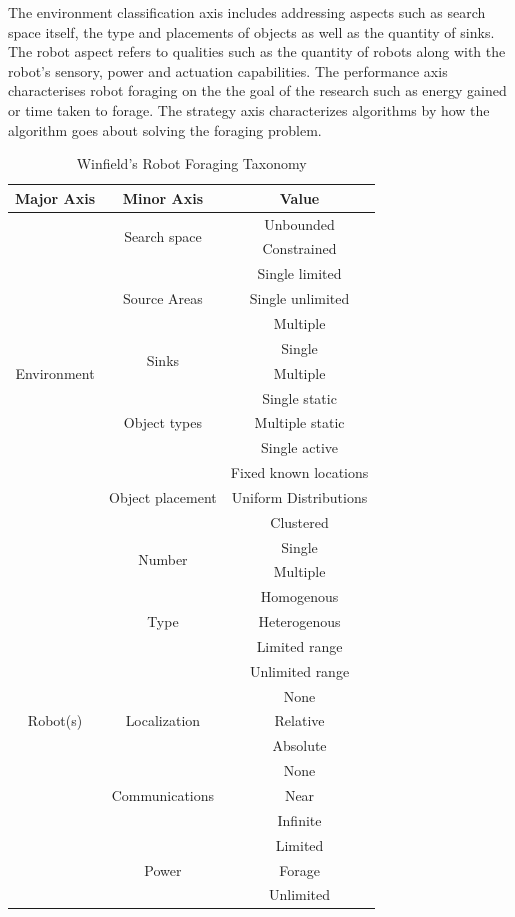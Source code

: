 The environment classification axis includes addressing aspects such as search space itself, the type and placements of objects as well as the quantity of sinks. The robot aspect refers to qualities such as  the quantity of robots along with the robot's sensory, power and actuation capabilities. The performance axis characterises robot foraging on the the goal of the research such as energy gained or time taken to forage. The strategy axis characterizes algorithms by how the algorithm goes about solving the foraging problem. 

\begin{table}
\centering
    \caption{Winfield's Robot Foraging Taxonomy}
    \label{foragingtaxonomytable_part1}
    
\begin{tabular}{ | c | c | c |}
	\hline
	Major Axis & Minor Axis & Value  \\ \hline
	\multirow{13}{*}{Environment}
		& \multirow{2}{*}{Search space} 
			& Unbounded \\  
		& 	& Constrained \\ \cline{2-3}
		& \multirow{3}{*}{Source Areas} 
			& Single limited \\ 
		&	& Single unlimited \\
		&	& Multiple \\ \cline{2-3}
		& \multirow{2}{*}{Sinks} 
			& Single \\
		&	& Multiple \\ \cline{2-3}
		& \multirow{3}{*}{Object types} 
			& Single static \\
		&	& Multiple static \\
		&	& Single active \\ \cline{2-3}
		& \multirow{3}{*}{Object placement} 
			& Fixed known locations \\
		&	& Uniform Distributions \\
		&	& Clustered \\\hline
	\multirow{16}{*}{Robot(s)}
		& \multirow{2}{*}{Number} 
			& Single \\  
		& 	& Multiple \\ \cline{2-3}
		& \multirow{3}{*}{Type} 
			& Homogenous \\ 
		&	& Heterogenous \\ \cline{2-3}
		& \multirow{2}{*}{Object Sensing} 
			& Limited range \\
		&	& Unlimited range\\ \cline{2-3}
		& \multirow{3}{*}{Localization} 
			& None \\
		&	& Relative \\
		&	& Absolute \\ \cline{2-3}
		& \multirow{3}{*}{Communications} 
			& None \\
		&	& Near \\
		&	& Infinite \\\cline{2-3}
		& \multirow{3}{*}{Power} 
			& Limited \\
		&	& Forage \\
		&	& Unlimited \\\hline
\end{tabular}
\end{table}

